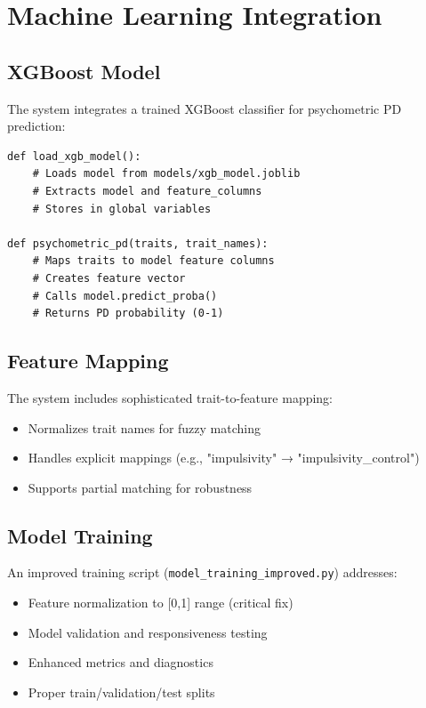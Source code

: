 \documentclass[11pt,a4paper]{article}
\begin{document}
\section{Machine Learning Integration}

\subsection{XGBoost Model}
The system integrates a trained XGBoost classifier for psychometric PD prediction:

\begin{lstlisting}[caption=Model Loading and Prediction]
def load_xgb_model():
    # Loads model from models/xgb_model.joblib
    # Extracts model and feature_columns
    # Stores in global variables

def psychometric_pd(traits, trait_names):
    # Maps traits to model feature columns
    # Creates feature vector
    # Calls model.predict_proba()
    # Returns PD probability (0-1)
\end{lstlisting}

\subsection{Feature Mapping}
The system includes sophisticated trait-to-feature mapping:
\begin{itemize}
    \item Normalizes trait names for fuzzy matching
    \item Handles explicit mappings (e.g., "impulsivity" → "impulsivity\_control")
    \item Supports partial matching for robustness
\end{itemize}

\subsection{Model Training}
An improved training script (\texttt{model\_training\_improved.py}) addresses:
\begin{itemize}
    \item Feature normalization to [0,1] range (critical fix)
    \item Model validation and responsiveness testing
    \item Enhanced metrics and diagnostics
    \item Proper train/validation/test splits
\end{itemize}
\end{document}
